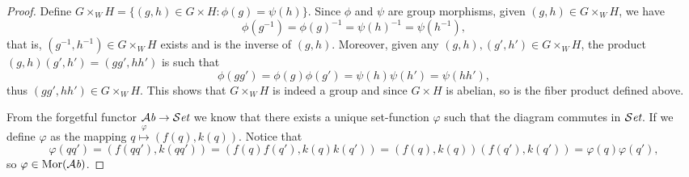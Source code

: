 \begin{proof}
  Define \(G \times_W H = \{(g, h) \in G \times H : \phi(g) = \psi(h)\}\). Since
  \(\phi\) and \(\psi\) are group morphisms, given \((g, h) \in G \times_W H\),
  we have
  \[
    \phi(g^{-1}) = \phi(g)^{-1} = \psi(h)^{-1} = \psi(h^{-1}),
  \]
  that is, \((g^{-1}, h^{-1}) \in G \times_W H\) exists and is the inverse of
  \((g, h)\). Moreover, given any \((g, h), (g', h') \in G \times_W H\), the
  product \((g, h)(g', h') = (gg', hh')\) is such that
  \[
    \phi(gg') = \phi(g) \phi(g') = \psi(h) \psi(h') = \psi(hh'),
  \]
  thus \((gg', hh') \in G \times_W H\). This shows that \(G \times_W H\) is
  indeed a group and since \(G \times H\) is abelian, so is the fiber product
  defined above.

  From the forgetful functor \({\mathcal{A}\textit{b}} \to {\mathcal{S}\textit{et}}\) we know that there exists a unique
  set-function \(\varphi\) such that the diagram commutes in \({\mathcal{S}\textit{et}}\). If we
  define \(\varphi\) as the mapping \(q \overset \varphi \longmapsto (f(q),
  k(q))\). Notice that
  \[
    \varphi(qq') = (f(qq'), k(qq')) = (f(q)f(q'), k(q)k(q'))
    = (f(q), k(q))(f(q'), k(q')) = \varphi(q) \varphi(q'),
  \]
  so \(\varphi \in \operatorname{Mor}({\mathcal{A}\textit{b}})\).
\end{proof}
